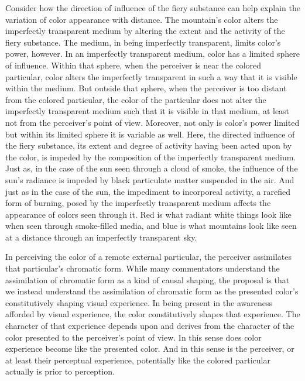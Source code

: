 Consider how the direction of influence of the fiery substance can help explain the variation of color appearance with distance. The mountain's color alters the imperfectly transparent medium by altering the extent and the activity of the fiery substance. The medium, in being imperfectly transparent, limits color's power, however. In an imperfectly transparent medium, color has a limited sphere of influence. Within that sphere, when the perceiver is near the colored particular, color alters the imperfectly transparent in such a way that it is visible within the medium. But outside that sphere, when the perceiver is too distant from the colored particular, the color of the particular does not alter the imperfectly transparent medium such that it is visible in that medium, at least not from the perceiver's point of view. Moreover, not only is color's power limited but within its limited sphere it is variable as well. Here, the directed influence of the fiery substance, its extent and degree of activity having been acted upon by the color, is impeded by the composition of the imperfectly transparent medium. Just as, in the case of the sun seen through a cloud of smoke, the influence of the sun's radiance is impeded by black particulate matter suspended in the air. And just as in the case of the sun, the impediment to incorporeal activity, a rarefied form of burning, posed by the imperfectly transparent medium affects the appearance of colors seen through it. Red is what radiant white things look like when seen through smoke-filled media, and blue is what mountains look like seen at a distance through an imperfectly transparent sky.

In perceiving the color of a remote external particular, the perceiver assimilates that particular's chromatic form. While many commentators understand the assimilation of chromatic form as a kind of causal shaping, the proposal is that we instead understand the assimilation of chromatic form as the presented color's constitutively shaping visual experience. In being present in the awareness afforded by visual experience, the color constitutively shapes that experience. The character of that experience depends upon and derives from the character of the color presented to the perceiver's point of view. In this sense does color experience become like the presented color. And in this sense is the perceiver, or at least their perceptual experience, potentially like the colored particular actually is prior to perception.

